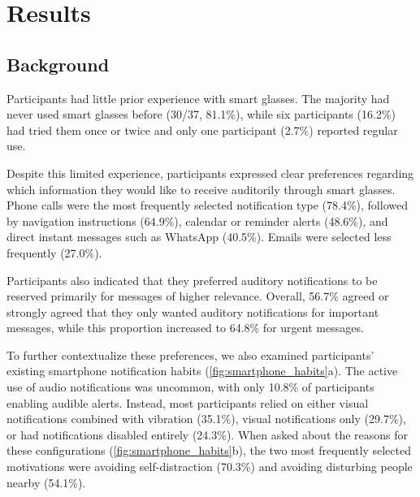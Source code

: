\section{Results}
\label{sec:results}




\subsection{Background}

Participants had little prior experience with smart glasses. The majority had never used smart glasses before (30/37, 81.1\%), while six participants (16.2\%) had tried them once or twice and only one participant (2.7\%) reported regular use.

Despite this limited experience, participants expressed clear preferences regarding which information they would like to receive auditorily through smart glasses. Phone calls were the most frequently selected notification type (78.4\%), followed by navigation instructions (64.9\%), calendar or reminder alerts (48.6\%), and direct instant messages such as WhatsApp (40.5\%). Emails were selected less frequently (27.0\%).

Participants also indicated that they preferred auditory notifications to be reserved primarily for messages of higher relevance. Overall, 56.7\% agreed or strongly agreed that they only wanted auditory notifications for important messages, while this proportion increased to 64.8\% for urgent messages.

To further contextualize these preferences, we also examined participants' existing smartphone notification habits (\autoref{fig:smartphone_habits}a). The active use of audio notifications was uncommon, with only 10.8\% of participants enabling audible alerts. Instead, most participants relied on either visual notifications combined with vibration (35.1\%), visual notifications only (29.7\%), or had notifications disabled entirely (24.3\%). When asked about the reasons for these configurations (\autoref{fig:smartphone_habits}b), the two most frequently selected motivations were avoiding self-distraction (70.3\%) and avoiding disturbing people nearby (54.1\%).


